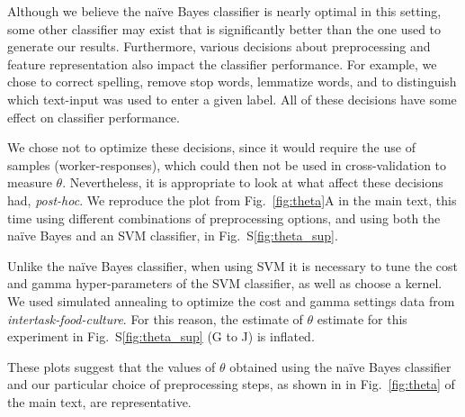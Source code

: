 \documentclass[12pt]{article}
\begin{document}
Although we believe the na\"ive Bayes classifier is nearly optimal in this
setting, some other classifier may exist that is significantly better than 
the one used to generate our results.  Furthermore, various decisions about
preprocessing and feature representation also
impact the classifier performance.  
For example, we chose to correct spelling, remove stop words,
lemmatize words, and to distinguish which text-input was used to enter a 
given label.  All of these decisions have some effect on classifier 
performance.

We chose not to optimize these decisions, since it would require the
use of samples (worker-responses), which could then not be used in 
cross-validation to measure $\theta$.  Nevertheless, it is
appropriate to look at what affect these decisions had, \textit{post-hoc}.  
We reproduce the plot from Fig.~\ref{fig:theta}A in the main text, 
this time using different combinations of preprocessing options,
and using both the na\"ive Bayes and an SVM classifier, in 
Fig.~S\ref{fig:theta_sup}.

Unlike the na\"ive Bayes classifier, when using SVM it is necessary to tune 
the cost and gamma hyper-parameters of the SVM classifier, as well as choose 
a kernel.  We used simulated annealing to optimize the cost and gamma settings
data from \textit{intertask-food-culture}.  For this reason, the estimate
of $\theta$ estimate for this experiment in 
Fig.~S\ref{fig:theta_sup} (G to J) is inflated. 

These plots suggest that the values of $\theta$ obtained using the 
na\"ive Bayes classifier and our particular choice of preprocessing steps, 
as shown in in Fig.~\ref{fig:theta} of the main text, are representative.
\end{document}
